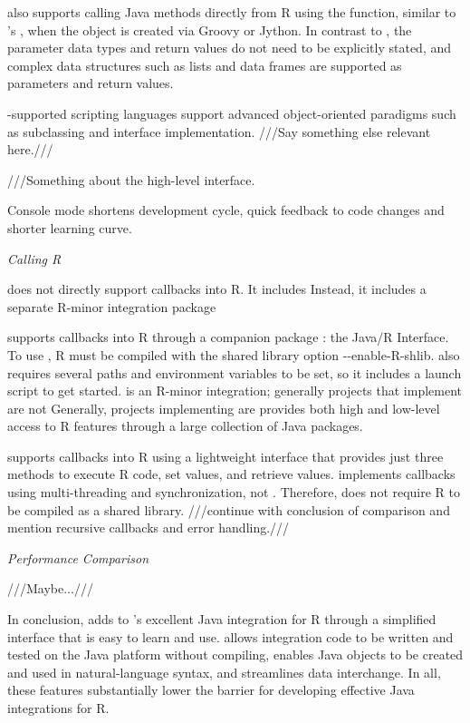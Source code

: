  also supports calling Java methods directly from R using the  function, similar to 's , when the object is created via Groovy or Jython. In contrast to , the parameter data types and return values do not need to be explicitly stated, and complex data structures such as lists and data frames are supported as parameters and return values.

-supported scripting languages support advanced object-oriented paradigms such as subclassing and interface implementation. ///Say something else relevant here.///

///Something about the high-level interface.

Console mode shortens development cycle, quick feedback to code changes and shorter learning curve.

\noindent \textit{Calling R}

\noindent {} does not directly support callbacks into R. It includes  Instead, it includes a separate R-minor integration package 

supports callbacks into R through a companion package : the Java/R Interface. To use , R must be compiled with the shared library option -{}-enable-R-shlib.  also requires several paths and environment variables to be set, so it includes a launch script to get started.  is an R-minor integration; generally projects that implement  are not  Generally, projects implementing  are   provides both high and low-level access to R features through a large collection of Java packages.

 supports callbacks into R using a lightweight interface that provides just three methods to execute R code, set values, and retrieve values.  implements callbacks using multi-threading and synchronization, not . Therefore,  does not require R to be compiled as a shared library. ///continue with conclusion of comparison and mention recursive callbacks and error handling.///

\noindent \textit{Performance Comparison}

\noindent ///Maybe...///

In conclusion,  adds to 's excellent Java integration for R through a simplified interface that is easy to learn and use.  allows integration code to be written and tested on the Java platform without compiling, enables Java objects to be created and used in natural-language syntax, and streamlines data interchange. In all, these features substantially lower the barrier for developing effective Java integrations for R.

